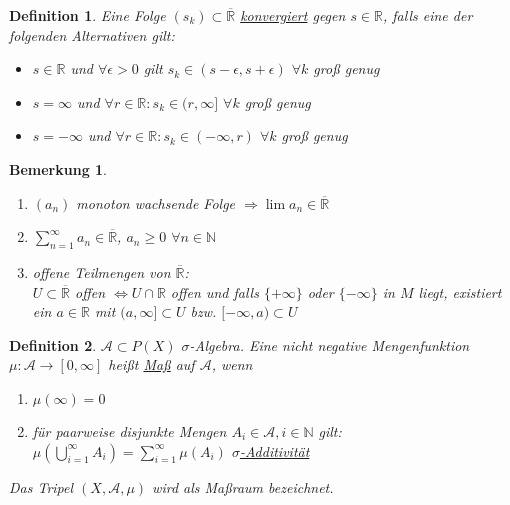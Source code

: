 \documentclass[11pt]{memoir}
\theoremstyle{changebreak}
\newtheorem{Definition}{Definition}[chapter]
\newtheorem{Bemerkung}{Bemerkung}[chapter]
\begin{document}
\begin{Definition}
Eine Folge $(s_{k}) \subset \overline{\mathbb{R}}$ \underline{konvergiert} gegen $s \in \mathbb{R}$, falls eine der folgenden Alternativen gilt:
\begin{itemize}
	\item  $s \in \mathbb{R}$ und $\forall \epsilon > 0$ gilt $s_{k} \in (s-\epsilon, s+\epsilon)$ $\forall k$ groß genug
	\item $s = \infty$ und $\forall r \in \mathbb{R}: s_{k} \in (r, \infty]$ $\forall k$ groß genug
	\item $s = -\infty$ und $\forall r \in \mathbb{R}: s_k \in (-\infty, r)$ $\forall k$ groß genug
\end{itemize}
\end{Definition}

\begin{Bemerkung}
\begin{enumerate}
	\item $(a_n)$ monoton wachsende Folge
	$\Rightarrow \lim a_n \in \mathbb{\overline{R}}$
	\item $\sum\limits_{n=1}^{\infty} a_n \in \mathbb{\overline{R}}$, $a_n \geq 0$ $ \forall n \in \mathbb{N}$
	\item offene Teilmengen von $\overline{\mathbb{R}}$: \\
	$U \subset \overline{\mathbb{R}} $ offen $\Leftrightarrow U \cap \mathbb{R}$ offen und falls $\{+\infty\}$ oder $\{-\infty\}$ in $M$ liegt, existiert ein $a \in \mathbb{R}$ mit $(a,{} \infty ]\subset U$ bzw. $[-\infty, a) \subset U$
\end{enumerate}
\end{Bemerkung}

\begin{Definition}
$\mathscr{A} \subset P(X)$ $\sigma$-Algebra. Eine nicht negative Mengenfunktion $\mu: \mathscr{A} \rightarrow [0, \infty]$ heißt \underline{Maß} auf $\mathscr{A}$, wenn
\begin{enumerate}
	\item $\mu(\infty) = 0$
	\item für paarweise disjunkte Mengen $A_i \in \mathscr{A}, i \in \mathbb{N}$ gilt: \\
	$\mu(\bigcup\limits_{i=1}^{\infty}A_i) = \sum\limits_{i=1}^{\infty} \mu(A_i)$ \underline{$\sigma$-Additivität}
\end{enumerate}
Das Tripel $(X, \mathscr{A}, \mu)$ wird als Maßraum bezeichnet.
\end{Definition}
\end{document}
